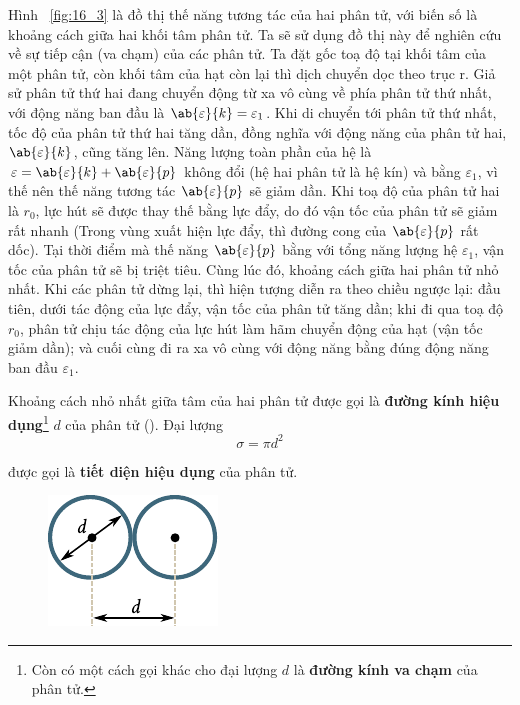 Hình ~\ref{fig:16_3} là đồ thị thế năng tương tác của hai phân tử, với biến số là khoảng cách giữa hai khối tâm phân tử. Ta sẽ sử dụng đồ thị này để nghiên cứu về sự tiếp cận (va chạm) của các phân tử. Ta đặt gốc toạ độ tại khối tâm của một phân tử, còn khối tâm của hạt còn lại thì dịch chuyển dọc theo trục r. Giả sử phân tử thứ hai đang chuyển động từ xa vô cùng về phía phân tử thứ nhất, với động năng ban đầu là $\ab{\varepsilon}{k}=\varepsilon_1$. Khi di chuyển tới phân tử thứ nhất, tốc độ của phân tử thứ hai tăng dần, đồng nghĩa với động năng của phân tử hai, $\ab{\varepsilon}{k}$, cũng tăng lên. Năng lượng toàn phần của hệ là $\varepsilon=\ab{\varepsilon}{k}+\ab{\varepsilon}{p}$ không đổi (hệ hai phân tử là hệ kín) và bằng $\varepsilon_1$, vì thế nên thế năng tương tác $\ab{\varepsilon}{p}$ sẽ giảm dần. Khi toạ độ của phân tử hai là $r_0$, lực hút sẽ được thay thế bằng lực đẩy, do đó vận tốc của phân tử sẽ giảm rất nhanh (Trong vùng xuất hiện lực đẩy, thì đường cong của $\ab{\varepsilon}{p}$ rất dốc). Tại thời điểm mà thế năng $\ab{\varepsilon}{p}$ bằng với tổng năng lượng hệ $\varepsilon_1$, vận tốc của phân tử sẽ bị triệt tiêu. Cùng lúc đó, khoảng cách giữa hai phân tử nhỏ nhất. Khi các phân tử dừng lại, thì hiện tượng diễn ra theo chiều ngược lại: đầu tiên, dưới tác động của lực đẩy, vận tốc của phân tử tăng dần; khi đi qua toạ độ $r_0$, phân tử chịu tác động của lực hút làm hãm chuyển động của hạt (vận tốc giảm dần); và cuối cùng đi ra xa vô cùng với động năng bằng đúng động năng ban đầu $\varepsilon_1$.


Khoảng cách nhỏ nhất giữa tâm của hai phân tử được gọi là \textbf{đường kính hiệu dụng}\footnote{Còn có một cách gọi khác cho đại lượng $d$ là \textbf{đường kính va chạm} của phân tử.} $d$ của phân tử (). Đại lượng 
\begin{equation}\label{eq:16_6}
    \sigma = \pi d^2
\end{equation}

\noindent
được gọi là \textbf{tiết diện hiệu dụng} của phân tử.

\begin{figure}[!htb]
	\begin{center}
		\includegraphics[scale=1]{figures/ch_16/fig_16_4.pdf}
		\caption[]{}
		\label{fig:16_4}
	\end{center}
\end{figure}

